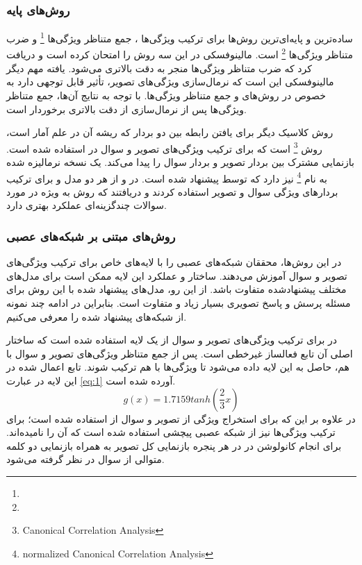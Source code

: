 \subsubsection{ روش‌های پایه}

ساده‌ترین و پایه‌ای‌ترین روش‌ها برای ترکیب ویژگی‌ها 
، جمع متناظر ویژگی‌ها
\footnote{}
و ضرب متناظر ویژگی‌ها
\footnote{}
 است. مالینوفسکی در
 \cite{malinowski2017ask}
 این سه روش را امتحان کرده است و دریافت کرد که  ضرب متناظر ویژگی‌ها منجر به دقت بالاتری‌ می‌شود. یافته مهم دیگر مالینوفسکی این است که نرمال‌سازی
  ویژگی‌های تصویر، تأثیر قابل توجهی دارد به خصوص در روش‌های
  و جمع متناظر ویژگی‌ها. با توجه به نتایج آن‌ها، جمع متناظر ویژگی‌ها پس از نرمال‌سازی از دقت بالاتری برخوردار است.
  
  روش کلاسیک دیگر برای یافتن رابطه بین دو بردار که ریشه آن در علم آمار است، روش 
  \footnote{Canonical Correlation Analysis}
   است که برای ترکیب ویژگی‌های تصویر و سوال در 
   استفاده شده است. 
    بازنمایی مشترک بین بردار تصویر و بردار سوال را پیدا می‌کند. 
     یک نسخه نرمالیزه شده به نام 
  \footnote{normalized Canonical Correlation Analysis}
  نیز دارد که توسط 
  \cite{gong2014multi}
   پیشنهاد شده است. در 
   \cite{yu2015visual}
   و 
   \cite{tommasi2019combining}
   از هر دو مدل 
    و 
     برای ترکیب بردارهای ویژگی سوال و تصویر استفاده کردند و دریافتند که روش 
     به ویژه در مورد سوالات چندگزینه‌ای عملکرد بهتری دارد.
     
\subsubsection{ روش‌های مبتنی بر شبکه‌های عصبی}
در این روش‌ها، محققان شبکه‌های عصبی را با لایه‌های خاص برای ترکیب ویژگی‌های تصویر و سوال آموزش می‌دهند. ساختار و عملکرد این لایه ممکن است برای مدل‌های مختلف پیشنهادشده متفاوت باشد. از این رو، مدل‌های پیشنهاد شده با این روش برای مسئله پرسش و پاسخ تصویری بسیار زیاد  و متفاوت است. بنابراین در ادامه چند نمونه از شبکه‌های پیشنهاد شده را معرفی می‌کنیم.

در 
\cite{gao2015you}
برای ترکیب ویژگی‌های تصویر و سوال از یک لایه استفاده شده است که ساختار اصلی آن تابع فعالساز غیرخطی 
است. پس از جمع متناظر ویژگی‌های تصویر و سوال با هم، حاصل به این لایه داده می‌شود تا ویژگی‌ها با هم ترکیب شوند. تابع اعمال شده در این لایه در عبارت 
\ref{eq:1}
آورده شده است.
\begin{equation}\label{eq:1}
 g(x)=1.7159tanh(\frac{2}{3}x)
\end{equation}
در 
\cite{Ma2016LearningTA}
علاوه بر این که برای استخراج ویژگی از تصویر و سوال از 
استفاده شده است؛ برای ترکیب ویژگی‌ها نیز از شبکه عصبی پیچشی استفاده شده است که آن را
نامیده‌اند. برای انجام کانولوشن در 
در هر پنجره بازنمایی کل تصویر به همراه بازنمایی دو کلمه متوالی از سوال در نظر گرفته می‌شود. 

